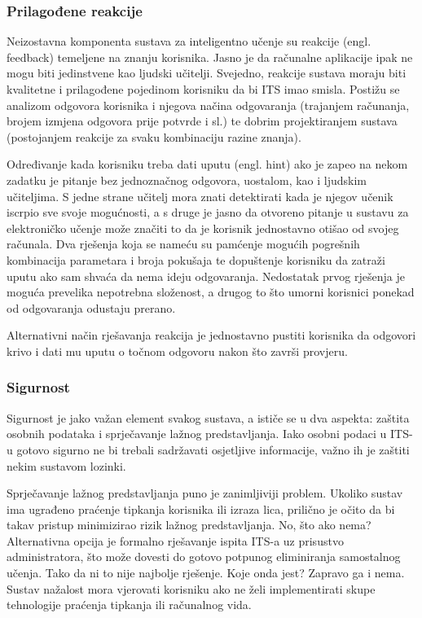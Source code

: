 \documentclass[times, utf8, zavrsni, numeric]{fer}
\begin{document}
\subsubsection{Prilagođene reakcije}
Neizostavna komponenta sustava za inteligentno učenje su reakcije (engl. feedback) temeljene na znanju korisnika.\citep{feedback} Jasno je da računalne aplikacije ipak ne mogu biti jedinstvene kao ljudski učitelji. Svejedno, reakcije sustava moraju biti kvalitetne i prilagođene pojedinom korisniku da bi ITS imao smisla. Postižu se analizom odgovora korisnika i njegova načina odgovaranja (trajanjem računanja, brojem izmjena odgovora prije potvrde i sl.) te dobrim projektiranjem sustava (postojanjem reakcije za svaku kombinaciju razine znanja).\citep{aect}
\par
Određivanje kada korisniku treba dati uputu (engl. hint) ako je zapeo na nekom zadatku je pitanje bez jednoznačnog odgovora, uostalom, kao i ljudskim učiteljima. S jedne strane učitelj mora znati detektirati kada je njegov učenik iscrpio sve svoje mogućnosti, a s druge je jasno da otvoreno pitanje u sustavu za elektroničko učenje može značiti to da je korisnik jednostavno otišao od svojeg računala. Dva rješenja koja se nameću su pamćenje mogućih pogrešnih kombinacija parametara i broja pokušaja te dopuštenje korisniku da zatraži uputu ako sam shvaća da nema ideju odgovaranja. Nedostatak prvog rješenja je moguća prevelika nepotrebna složenost, a drugog to što umorni korisnici ponekad od odgovaranja odustaju prerano.
\par
Alternativni način rješavanja reakcija je jednostavno pustiti korisnika da odgovori krivo i dati mu uputu o točnom odgovoru nakon što završi provjeru.

\subsubsection{Sigurnost}
Sigurnost je jako važan element svakog sustava, a ističe se u dva aspekta: zaštita osobnih podataka i sprječavanje lažnog predstavljanja. Iako osobni podaci u ITS-u gotovo sigurno ne bi trebali sadržavati osjetljive informacije, važno ih je zaštiti nekim sustavom lozinki.\citep{security}
\par
Sprječavanje lažnog predstavljanja puno je zanimljiviji problem. Ukoliko sustav ima ugrađeno praćenje tipkanja korisnika ili izraza lica, prilično je očito da bi takav pristup minimizirao rizik lažnog predstavljanja. No, što ako nema? Alternativna opcija je formalno rješavanje ispita ITS-a uz prisustvo administratora, što može dovesti do gotovo potpunog eliminiranja samostalnog učenja. Tako da ni to nije najbolje rješenje. Koje onda jest? Zapravo ga i nema. Sustav nažalost mora vjerovati korisniku ako ne želi implementirati skupe tehnologije praćenja tipkanja ili računalnog vida.
\end{document}
